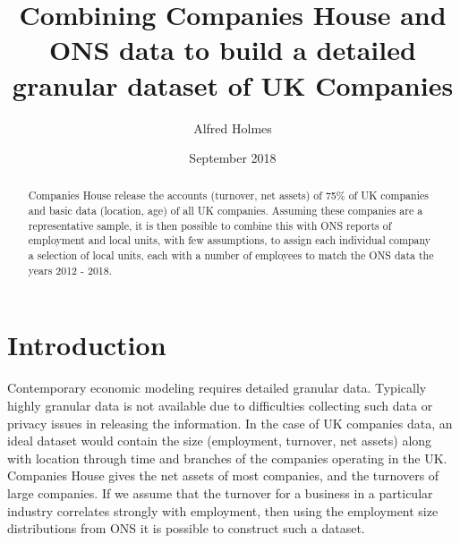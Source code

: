 \documentclass[a4paper,10pt]{article}
\title{Combining Companies House and ONS data to build a detailed granular dataset of UK Companies}
\author{Alfred Holmes}
\date{September 2018}
\begin{document}
\maketitle
\begin{abstract}Companies House release the accounts (turnover, net assets) of 75\% of UK companies and basic data (location, age) of all UK companies. Assuming these companies are a representative sample, it is then possible to combine this with ONS reports of employment and local units, with few assumptions, to assign each individual company a selection of local units, each with a number of employees to match the ONS data the years 2012 - 2018. 
\end{abstract}
 
\section{Introduction}
Contemporary economic modeling requires detailed granular data. Typically highly granular data is not available due to difficulties collecting such data or privacy issues in releasing the information. In the case of UK companies data, an ideal dataset would contain the size (employment, turnover, net assets) along with location through time and branches of the companies operating in the UK. Companies House gives the net assets of most companies, and the turnovers of large companies. If we assume that the turnover for a business in a particular industry correlates strongly with employment, then using the employment size distributions from ONS it is possible to construct such a dataset.
\end{document}
